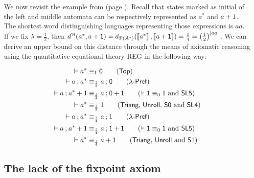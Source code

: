 We now revisit the example from  (page \pageref{c2:fig:dfas}). Recall that states marked as initial of the left and middle automata can be respectively represented as $a^\ast$ and $a + \mathsf{1}$. The shortest word distinguishing languages representing those expressions is $aa$. If we fix $\lambda = \frac{1}{2}$, then $d^{\mathcal{B}}(a^\ast, a + \mathsf{1})= d_{\mathcal{P}({A}^{\ast})}(\left\llbracket{a^\ast}\right\rrbracket, \left\llbracket{a+ \mathsf{1}}\right\rrbracket) = \frac{1}{4}=\left(\frac{1}{2}\right)^{|aa|}$. We can derive an upper bound on this distance through the means of axiomatic reasoning using the quantitative equational theory \textsf{REG} in the following way: 
\begin{example}
 	\begin{align*}
		\vdash a^* &\equiv_1 \zero \tag{$\Top$} \\
		\vdash a \seq a^{\ast} &\equiv_{\frac{1}{2}} a \seq \zero\tag{$\dPref$}\\
		\vdash a \seq a^\ast + 1&\equiv_{\frac{1}{2}} a \seq \zero + \one  \tag{$\vdash \one \equiv_0 \one$ and \textsf{SL5}}\\
		\vdash a^{\ast} &\equiv_{\frac{1}{2}} \one \tag{$\Triang$, \textsf{Unroll}, \textsf{S0} and \textsf{SL4}}\\
		\vdash a \seq a^\ast &\equiv_{\frac{1}{4}} a \seq 1 \tag{$\dPref$}\\
		\vdash a \seq a^\ast + 1 &\equiv_{\frac{1}{4}} a \seq \one + \one  \tag{$\vdash \one \equiv_0 \one$ and \textsf{SL5}}\\
		\vdash a^\ast &\equiv_{\frac{1}{4}} a + \one \tag{$\Triang$, \textsf{Unroll} and \textsf{S1}}\\
	\end{align*}
\end{example}
\subsection{The lack of the fixpoint axiom}\label{c2:subsec:fixpoint_axiom}

